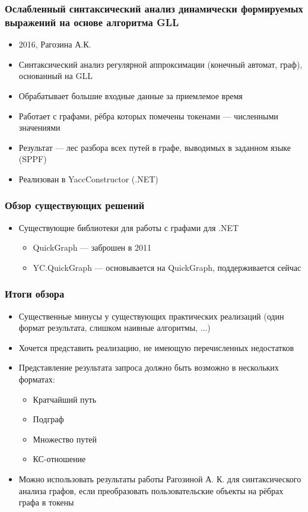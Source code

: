 \documentclass{beamer}
\begin{document}
\begin{frame}
  \transwipe[direction=90]
  \frametitle{Ослабленный синтаксический анализ динамически формируемых выражений на основе алгоритма GLL}
  \begin{itemize}
    \item 2016, Рагозина А.К.
    \item Синтаксический анализ регулярной аппроксимации (конечный автомат, граф), основанный на GLL
    \item Обрабатывает большие входные данные за приемлемое время
    \item Работает с графами, рёбра которых помечены токенами --- численными значениями
    \item Результат --- лес разбора всех путей в графе, выводимых в заданном языке (SPPF)
    \item Реализован в YaccConstructor (.NET)
  \end{itemize}
\end{frame}

\begin{frame}
  \transwipe[direction=90]
  \frametitle{Обзор существующих решений}
  \begin{itemize}
    \item Существующие библиотеки для работы с графами для .NET
    \begin{itemize}
        \item QuickGraph --- заброшен в 2011
        \item YC.QuickGraph --- основывается на QuickGraph, поддерживается сейчас
    \end{itemize}
  \end{itemize}
\end{frame}

\begin{frame}
  \transwipe[direction=90]
  \frametitle{Итоги обзора}
  \begin{itemize}
    \item Существенные минусы у существующих практических реализаций (один формат результата, слишком наивные алгоритмы, ...)
    \item Хочется представить реализацию, не имеющую перечисленных недостатков
    \item Представление результата запроса должно быть возможно в нескольких форматах:
    \begin{itemize}
        \item Кратчайший путь
        \item Подграф
        \item Множество путей
        \item КС-отношение
    \end{itemize}
    \item Можно использовать результаты работы Рагозиной А. К. для синтаксического анализа графов, если преобразовать пользовательские объекты на рёбрах графа в токены
  \end{itemize}
\end{frame}
\end{document}
